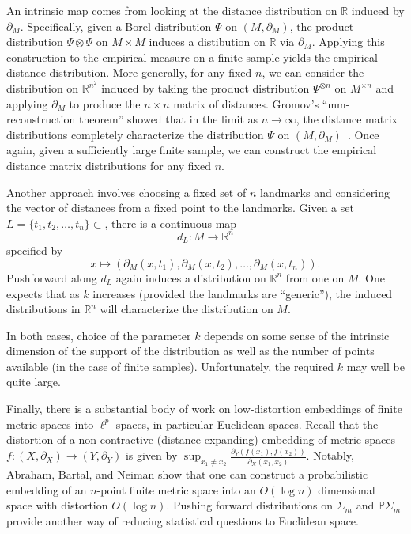 \documentclass[a4paper,11pt]{article}
\begin{document}
An intrinsic map comes from looking at the distance distribution on $\mathbb{R}$ induced by $\partial_M$.
Specifically, given a Borel distribution $\Psi$ on $(M, \partial_M)$, the product distribution $\Psi \otimes \Psi$ on $M \times M$ induces a distibution on $\mathbb{R}$ via $\partial_M$.
Applying this construction to the empirical measure on a finite sample yields the empirical distance distribution.
More generally, for any fixed $n$, we can consider the distribution on $\mathbb{R}^{n^2}$ induced by taking the product distribution $\Psi^{\otimes n}$ on $M^{\times n}$ and applying $\partial_M$ to produce the $n \times n$ matrix of distances.
Gromov's ``mm-reconstruction theorem'' showed that in the limit as $n \to \infty$, the distance matrix distributions completely characterize the distribution $\Psi$ on $(M, \partial_M)$~\cite{gromov1981}.
Once again, given a sufficiently large finite sample, we can construct the empirical distance matrix distributions for any fixed $n$.

Another approach involves choosing a fixed set of $n$ landmarks and considering the vector of distances from a fixed point to the landmarks.
Given a set $L = \{t_1, t_2, \ldots, t_n\} \subset $, there is a continuous map
\[
d_L \colon M \to \mathbb{R}^n
\]
specified by
\[
x \mapsto (\partial_M(x,t_1), \partial_M(x,t_2), \ldots, \partial_M(x,t_n)).
\]
Pushforward along $d_L$ again induces a distribution on $\mathbb{R}^n$ from one on $M$.
One expects that as $k$ increases (provided the landmarks are ``generic''), the induced distributions in $\mathbb{R}^n$ will characterize the distribution on $M$.

In both cases, choice of the parameter $k$ depends on some sense of the intrinsic dimension of the support of the distribution as well as the number of points available (in the case of finite samples).
Unfortunately, the required $k$ may well be quite large.

Finally, there is a substantial body of work on low-distortion embeddings of finite metric spaces into $\ell^p$ spaces, in particular Euclidean spaces.
Recall that the distortion of a non-contractive (distance expanding) embedding of metric spaces $f \colon (X, \partial_X) \to (Y, \partial_Y)$ is given by $\sup_{x_1 \neq x_2} \frac{\partial_Y (f(x_1), f(x_2))}{\partial_X (x_1, x_2)}$.
Notably, Abraham, Bartal, and Neiman show that one can construct a probabilistic embedding of an $n$-point finite metric space into an $O(\log n)$ dimensional space with distortion $O(\log n)$.
Pushing forward distributions on $\Sigma_m$ and $\mathbb{P}\Sigma_m$
provide another way of reducing statistical questions to Euclidean
space.
\end{document}
